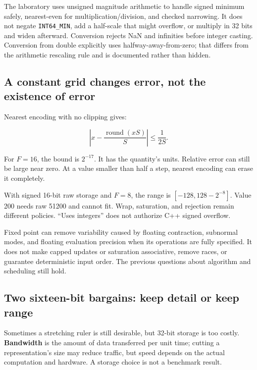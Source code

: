 The laboratory uses unsigned magnitude arithmetic to handle signed minimum safely, nearest-even for multiplication/division, and checked narrowing. It does not negate \texttt{INT64\_MIN}, add a half-scale that might overflow, or multiply in 32 bits and widen afterward. Conversion rejects NaN and infinities before integer casting. Conversion from double explicitly uses halfway-away-from-zero; that differs from the arithmetic rescaling rule and is documented rather than hidden.

\subsection{A constant grid changes error, not the existence of error}\label{01-foundations-i-ch001-a-constant-grid-changes-error-not-the-existence-of-error}

Nearest encoding with no clipping gives:

\[
\left|x-\frac{\operatorname{round}(xS)}{S}\right|\le\frac{1}{2S}.
\]

For \(F=16\), the bound is \(2^{-17}\). It has the quantity's units. Relative error can still be large near zero. At a value smaller than half a step, nearest encoding can erase it completely.

With signed 16-bit raw storage and \(F=8\), the range is \([-128,128-2^{-8}]\). Value 200 needs raw 51200 and cannot fit. Wrap, saturation, and rejection remain different policies. ``Uses integers'' does not authorize C++ signed overflow.

Fixed point can remove variability caused by floating contraction, subnormal modes, and floating evaluation precision when its operations are fully specified. It does not make capped updates or saturation associative, remove races, or guarantee deterministic input order. The previous questions about algorithm and scheduling still hold.

\subsection{Two sixteen-bit bargains: keep detail or keep range}\label{01-foundations-i-ch001-two-sixteen-bit-bargains-keep-detail-or-keep-range}

Sometimes a stretching ruler is still desirable, but 32-bit storage is too costly. \textbf{Bandwidth} is the amount of data transferred per unit time; cutting a representation's size may reduce traffic, but speed depends on the actual computation and hardware. A storage choice is not a benchmark result.

